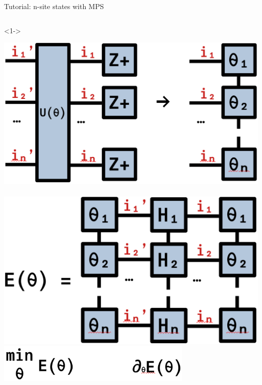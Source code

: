 \begin{frame}[fragile]{Tutorial: n-site states with MPS}
\begin{columns}
\begin{column}{4.5cm}
\begin{onlyenv}<1->
\vspace*{0.0cm}
\begin{center}
\includegraphics[width=\textwidth]{
  slides/assets/U_Zpn.png
} \\
~\\
\includegraphics[width=1.0\textwidth]{
  slides/assets/thetan_H_thetan.png
} \\
\includegraphics[width=0.7\textwidth]{
  slides/assets/min_grad_E_theta.png
}
\end{center}
\vspace*{0.0cm}
\end{onlyenv}



\end{column}
\end{columns}
\end{frame}
